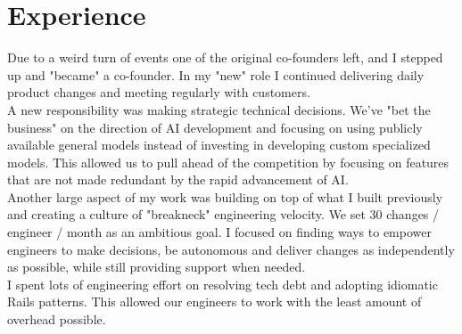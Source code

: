 \documentclass[]{matija-resume}
\begin{document}
\begin{minipage}[t]{1.0\textwidth}


\section{Experience}

\vspace{\topsep}
Due to a weird turn of events one of the original co-founders left, and I stepped up and "became" a co-founder. In my "new" role I continued delivering daily product changes and meeting regularly with customers.\\
\vspace{\topsep}
A new responsibility was making strategic technical decisions. We've "bet the business" on the direction of AI development and focusing on using publicly available general models instead of investing in developing custom specialized models. This allowed us to pull ahead of the competition by focusing on features that are not made redundant by the rapid advancement of AI.\\
\vspace{\topsep}
Another large aspect of my work was building on top of what I built previously and creating a culture of "breakneck" engineering velocity. We set 30 changes / engineer / month as an ambitious goal. I focused on finding ways to empower engineers to make decisions, be autonomous and deliver changes as independently as possible, while still providing support when needed.\\
\vspace{\topsep}
I spent lots of engineering effort on resolving tech debt and adopting idiomatic Rails patterns. This allowed our engineers to work with the least amount of overhead possible.
\vspace{\topsep}

\sectionsep


\end{minipage}
\end{document}
